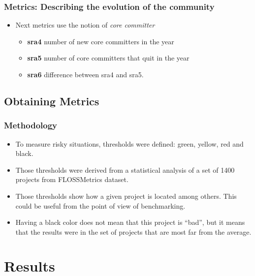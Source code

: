 \documentclass{beamer}
\begin{document}
\begin{frame}
\frametitle{Metrics: Describing the evolution of the community}
\begin{center}
\begin{itemize}
\item Next metrics use the notion of \textit{core committer}
\begin{itemize}
\item \textbf{sra4} number of new core committers in the year
\item \textbf{sra5} number of core committers that quit in the year
\item \textbf{sra6} difference between sra4 and sra5.

\end{itemize}
\end{itemize}
\end{center}
\end{frame}



\subsection{Obtaining Metrics}

\begin{frame}
\frametitle{Methodology}
\begin{center}
\begin{itemize}
\item To measure risky situations, thresholds were defined: green, yellow, red and black.
\item Those thresholds were derived from a statistical analysis of a set of 1400 projects from FLOSSMetrics dataset.
\item Those thresholds show how a given project is located among others. This could be useful from
the point of view of benchmarking. 
\item Having a black color does not mean that this project is ``bad'', but it means that the results were in the set of projects that are most far from the average.

\end{itemize}
\end{center}
\end{frame}





\section{Results}
\end{document}
